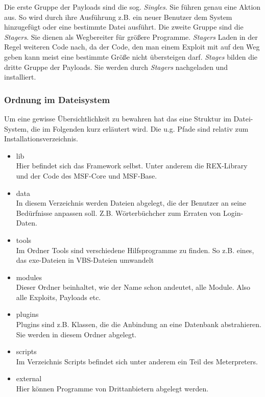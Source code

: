 Die erste Gruppe der Payloads sind die sog. \emph{Singles}. Sie führen
genau eine Aktion aus. So wird durch ihre Ausführung z.B. ein neuer
Benutzer dem System hinzugefügt oder eine bestimmte Datei ausführt. 
Die zweite Gruppe sind die \emph{Stagers}. Sie dienen als Wegbereiter
für größere Programme. \emph{Stagers} Laden in der Regel weiteren Code
nach, da der Code, den man einem Exploit mit auf den Weg geben kann
meist eine bestimmte Größe nicht übersteigen darf. 
\emph{Stages} bilden die dritte Gruppe der Payloads. Sie werden durch
\emph{Stagers} nachgeladen und installiert. 

\subsubsection{Ordnung im Dateisystem}

Um eine gewisse Übersichtlichkeit zu bewahren hat das 
eine Struktur im Datei-System, die im Folgenden kurz erläutert
wird. Die u.g. Pfade sind relativ zum Installationsverzeichnis.

\begin{itemize}
  \item lib\\
    Hier befindet sich das Framework selbst. Unter anderem die
    REX-Library und der Code des MSF-Core und MSF-Base.
  \item data\\
    In diesem Verzeichnis werden Dateien abgelegt, die der Benutzer an
    seine Bedürfnisse anpassen soll. Z.B. Wörterbüchcher zum Erraten
    von Login-Daten. 
  \item tools\\
    Im Ordner Tools sind verschiedene Hilfsprogramme zu finden. So
    z.B. eines, das exe-Dateien in VBS-Dateien umwandelt
  \item modules\\
    Dieser Ordner beinhaltet, wie der Name schon andeutet, alle
    Module. Also alle Exploits, Payloads etc. 
  \item plugins\\
    Plugins sind z.B. Klassen, die die Anbindung an eine Datenbank
    abstrahieren. Sie werden in diesem Ordner abgelegt.
  \item scripts\\
    Im Verzeichnis Scripts befindet sich unter anderem ein Teil des
    Meterpreters. 
  \item external\\
    Hier können Programme von Drittanbietern abgelegt werden.
\end{itemize}

